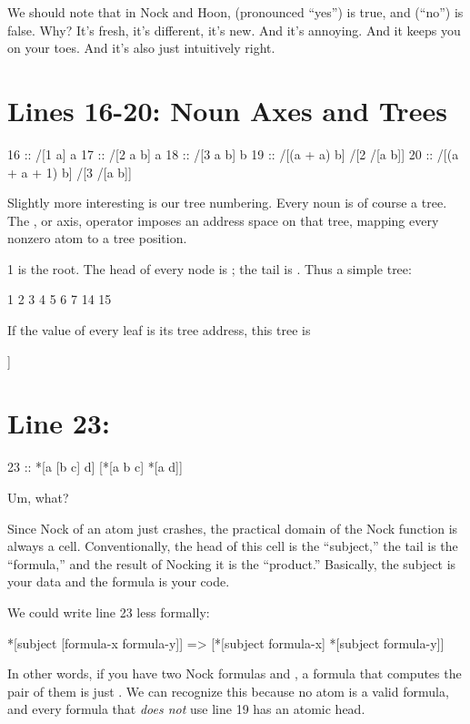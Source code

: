 We should note that in Nock and Hoon,  (pronounced ``yes'') is true, and 
(``no'') is false.  Why?  It's fresh, it's different, it's new.  And it's
annoying.  And it keeps you on your toes.  And it's also just intuitively
right.

\section{Lines 16-20: Noun Axes and Trees}

\begin{code}
16 ::    /[1 a]           a
17 ::    /[2 a b]         a
18 ::    /[3 a b]         b
19 ::    /[(a + a) b]     /[2 /[a b]]
20 ::    /[(a + a + 1) b] /[3 /[a b]]
\end{code}
Slightly more interesting is our tree numbering.  Every noun is of course a
tree.  The \kode{/}, or axis, operator imposes an address space on that tree,
mapping every nonzero atom to a tree position.

1 is the root.  The head of every node  is ; the tail is .  Thus a
simple tree:

\begin{code}
     1
  2      3
4   5  6   7
         14 15
\end{code}
If the value of every leaf is its tree address, this tree is

\begin{code}
  [[4 5] [6 14 15]]
\end{code}

\section{Line 23:}

\begin{code}
23 ::    *[a [b c] d]      [*[a b c] *[a d]]
\end{code}

Um, what?

Since Nock of an atom just crashes, the practical domain of the Nock function
is always a cell.  Conventionally, the head of this cell is the ``subject,'' the
tail is the ``formula,'' and the result of Nocking it is the ``product.''
Basically, the subject is your data and the formula is your code.

We could write line 23 less formally:

\begin{code}
*[subject [formula-x formula-y]]
=>  [*[subject formula-x] *[subject formula-y]]
\end{code}
In other words, if you have two Nock formulas  and , a formula that
computes the pair of them is just \kode{[x y]}.  We can recognize this because no
atom is a valid formula, and every formula that \emph{does not} use line 19 has an
atomic head.

